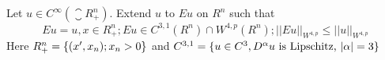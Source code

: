 Let $u \in C^\infty(\closure{R}_+^n)$. Extend $u$ to $Eu$ on $R^n$ such that
$$
Eu = u, x \in R_+^n; Eu \in C^{3, 1}(R^n) \cap W^{4, p}(R^n); ||Eu||_{W^{4, p}} \leq ||u||_{W^{4, p}}
$$
Here $R_+^n = \{ (x', x_n); x_n > 0 \}$ and $C^{3, 1} = \{ u \in C^3, D^\alpha u \text{ is Lipschitz, } |\alpha| = 3 \}$
